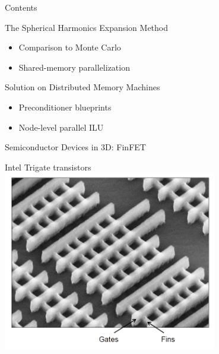 \documentclass[usepdftitle=false,handout,10pt]{beamer}
\begin{document}

\begin{frame}{Contents}
  \begin{block}{The Spherical Harmonics Expansion Method}
   \begin{itemize}
    \item Comparison to Monte Carlo
    \item Shared-memory parallelization
   \end{itemize}
  \end{block}
  
  \begin{block}{Solution on Distributed Memory Machines}
   \begin{itemize}
    \item Preconditioner blueprints
    \item Node-level parallel ILU
   \end{itemize}
  \end{block}
  
\end{frame}


\begin{frame} {Semiconductor Devices in 3D: FinFET} 
  
 \begin{center} 
   {\footnotesize Intel Trigate transistors} \\
   \includegraphics[width=0.7\textwidth]{intel-trigate}
 \end{center} 
 
\end{frame} 
\end{document}

